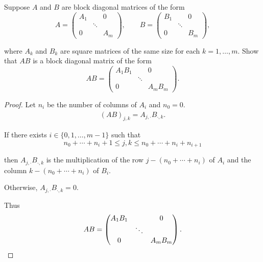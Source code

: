 \begin{exercise}\label{chapter8:sectionB:exercise22}
    Suppose $A$ and $B$ are block diagonal matrices of the form
    \[
        A = \begin{pmatrix}
            A_{1} &        & 0     \\
                  & \ddots &       \\
            0     &        & A_{m}
        \end{pmatrix},
        \qquad
        B = \begin{pmatrix}
            B_{1} &        & 0     \\
                  & \ddots &       \\
            0     &        & B_{m}
        \end{pmatrix},
    \]

    where $A_{k}$ and $B_{k}$ are square matrices of the same size for each $k = 1, \ldots, m$. Show that $AB$ is a block diagonal matrix of the form
    \[
        AB = \begin{pmatrix}
            A_{1}B_{1} &        & 0          \\
                       & \ddots &            \\
            0          &        & A_{m}B_{m}
        \end{pmatrix}.
    \]
\end{exercise}

\begin{proof}
    Let $n_{i}$ be the number of columns of $A_{i}$ and $n_{0} = 0$.
    \begin{align*}
        {(AB)}_{j,k} = A_{j,\cdot}B_{\cdot,k}.
    \end{align*}

    If there exists $i\in\{0,1,\ldots,m-1\}$ such that
    \[
        n_{0} + \cdots + n_{i} + 1\leq j, k\leq n_{0} + \cdots + n_{i} + n_{i+1}
    \]

    then $A_{j,\cdot}B_{\cdot,k}$ is the multiplication of the row $j - (n_{0} + \cdots + n_{i})$ of $A_{i}$ and the column $k - (n_{0} + \cdots + n_{i})$ of $B_{i}$.

    Otherwise, $A_{j,\cdot}B_{\cdot,k} = 0$.

    Thus
    \[
        AB = \begin{pmatrix}
            A_{1}B_{1} &        & 0          \\
                       & \ddots &            \\
            0          &        & A_{m}B_{m}
        \end{pmatrix}.\qedhere
    \]
\end{proof}
\newpage

